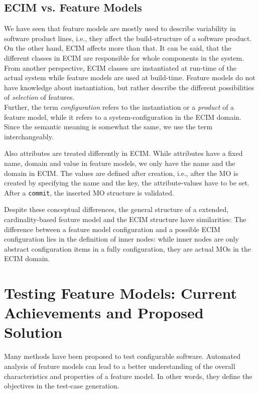 \subsection{ECIM vs. Feature Models}

We have seen that feature models are mostly used to describe variability in software product lines, i.e., they affect the build-structure of a software product. On the other hand, ECIM affects more than that. It can be said, that the different classes in ECIM are responsible for whole components in the system. From another perspective, ECIM classes are instantiated at run-time of the actual system while feature models are used at build-time. Feature models do not have knowledge about instantiation, but rather describe the different possibilities of \emph{selection} of features. \\

Further, the term \emph{configuration} refers to the instantiation or a \emph{product} of a feature model, while it refers to a system-configuration in the ECIM domain. Since the semantic meaning is somewhat the same, we use the term interchangeably.

Also attributes are treated differently in ECIM. While attributes have a fixed name, domain and value in feature models, we only have the name and the domain in ECIM. The values are defined after creation, i.e., after the MO is created by specifying the name and the key, the attribute-values have to be set. After a \verb|commit|, the inserted MO structure is validated.

Despite these conceptual differences, the general structure of a extended, cardinality-based feature model and the ECIM structure have similarities: The difference between a feature model configuration and a possible ECIM configuration lies in the definition of inner nodes: while inner nodes are only abstract configuration items in a fully configuration, they are actual MOs in the ECIM domain. 






\section{Testing Feature Models: Current Achievements and Proposed Solution}\label{sec:test-conf}

Many methods have been proposed to test configurable software. Automated analysis of feature models can lead to a better understanding of the overall characteristics and properties of a feature model. In other words, they define the objectives in the test-case generation. 

